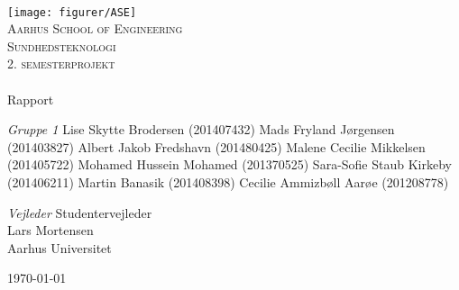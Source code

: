 \begin{titlingpage}
\begin{center}

~ \\[3cm]

\texttt{[image: figurer/ASE]}~\\[1cm]

\textsc{\LARGE Aarhus School of Engineering}\\[1.5cm]

\textsc{\Large Sundhedsteknologi}\\
\textsc{\Large 2. semesterprojekt}\\[0.5cm]

\noindent\makebox[\linewidth]{\rule{\textwidth}{0.4pt}}\\
[0.5cm]{\Huge Rapport}
\noindent\makebox[\linewidth]{\rule{\textwidth}{0.4pt}}

\end{center}

\textit{Gruppe 1} \newline
Lise Skytte Brodersen (201407432) \newline
Mads Fryland J\o rgensen (201403827) \newline
Albert Jakob Fredshavn (201480425) \newline
Malene Cecilie Mikkelsen (201405722) \newline		 
Mohamed Hussein Mohamed (201370525) \newline 
Sara-Sofie Staub Kirkeby (201406211) \newline
Martin Banasik (201408398) \newline
Cecilie Ammizb\o ll Aar\o e (201208778) \newline 


\textit{Vejleder} \newline
Studentervejleder\\
Lars Mortensen\\
Aarhus Universitet


\vfill

\begin{center}
{\large \today}
\end{center}


\end{titlingpage}